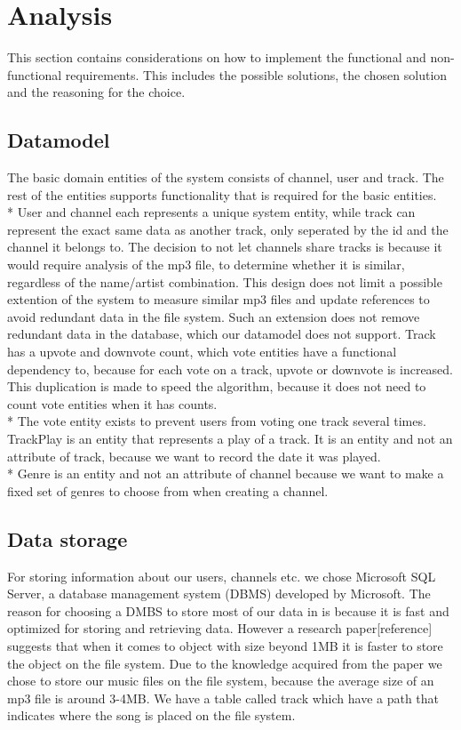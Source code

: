 \documentclass[a4paper,11pt,report]{article}
\begin{document}
\section{Analysis}
This section contains considerations on how to implement the functional and non-functional requirements. This includes the possible solutions, the chosen solution and the reasoning for the choice.

\subsection{Datamodel}
The basic domain entities of the system consists of channel, user and track. The rest of the entities supports functionality that is required for the basic entities. \\*
User and channel each represents a unique system entity, while track can represent the exact same data as another track, only seperated by the id and the channel it belongs to.
The decision to not let channels share tracks is because it would require analysis of the mp3 file, to determine whether it is similar, regardless of the name/artist combination.
This design does not limit a possible extention of the system to measure similar mp3 files and update references to avoid redundant data in the file system.
Such an extension does not remove redundant data in the database, which our datamodel does not support. Track has a upvote and downvote count, which vote entities have a functional dependency to,
because for each vote on a track, upvote or downvote is increased. This duplication is made to speed the algorithm, because it does not need to count vote entities when it has counts. \\*
The vote entity exists to prevent users from voting one track several times.
TrackPlay is an entity that represents a play of a track. It is an entity and not an attribute of track, because we want to record the date it was played. \\*
Genre is an entity and not an attribute of channel because we want to make a fixed set of genres to choose from when creating a channel. 

\subsection{Data storage}
For storing information about our users, channels etc. we chose Microsoft SQL Server, a database management system (DBMS) developed by Microsoft. The reason for choosing a DMBS to store most of our data in is because it is fast and optimized for storing and retrieving data. However a research paper[reference] suggests that when it comes to object with size beyond 1MB it is faster to store the object on the file system. Due to the knowledge acquired from the paper we chose to store our music files on the file system, because the average size of an mp3 file is around 3-4MB. We have a table called track which have a path that indicates where the song is placed on the file system.
\end{document}
